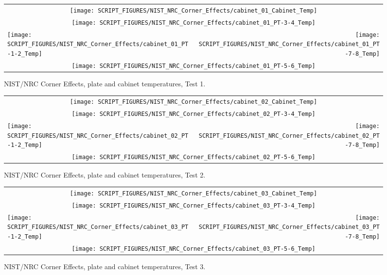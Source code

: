 \newpage

\begin{figure}[p]
\begin{tabular*}{\textwidth}{l@{\extracolsep{\fill}}r}
\multicolumn{2}{c}{\texttt{[image: SCRIPT\_FIGURES/NIST\_NRC\_Corner\_Effects/cabinet\_01\_Cabinet\_Temp]}} \\
\multicolumn{2}{c}{\texttt{[image: SCRIPT\_FIGURES/NIST\_NRC\_Corner\_Effects/cabinet\_01\_PT-3-4\_Temp]}} \\
\texttt{[image: SCRIPT\_FIGURES/NIST\_NRC\_Corner\_Effects/cabinet\_01\_PT-1-2\_Temp]} &
\texttt{[image: SCRIPT\_FIGURES/NIST\_NRC\_Corner\_Effects/cabinet\_01\_PT-7-8\_Temp]} \\
\multicolumn{2}{c}{\texttt{[image: SCRIPT\_FIGURES/NIST\_NRC\_Corner\_Effects/cabinet\_01\_PT-5-6\_Temp]}}
\end{tabular*}
\caption{NIST/NRC Corner Effects, plate and cabinet temperatures, Test 1.}
\label{NIST_NRC_Cabinet_PT_Test_1}
\end{figure}

\begin{figure}[p]
\begin{tabular*}{\textwidth}{l@{\extracolsep{\fill}}r}
\multicolumn{2}{c}{\texttt{[image: SCRIPT\_FIGURES/NIST\_NRC\_Corner\_Effects/cabinet\_02\_Cabinet\_Temp]}} \\
\multicolumn{2}{c}{\texttt{[image: SCRIPT\_FIGURES/NIST\_NRC\_Corner\_Effects/cabinet\_02\_PT-3-4\_Temp]}} \\
\texttt{[image: SCRIPT\_FIGURES/NIST\_NRC\_Corner\_Effects/cabinet\_02\_PT-1-2\_Temp]} &
\texttt{[image: SCRIPT\_FIGURES/NIST\_NRC\_Corner\_Effects/cabinet\_02\_PT-7-8\_Temp]} \\
\multicolumn{2}{c}{\texttt{[image: SCRIPT\_FIGURES/NIST\_NRC\_Corner\_Effects/cabinet\_02\_PT-5-6\_Temp]}}
\end{tabular*}
\caption{NIST/NRC Corner Effects, plate and cabinet temperatures, Test 2.}
\label{NIST_NRC_Cabinet_PT_Test_2}
\end{figure}

\begin{figure}[p]
\begin{tabular*}{\textwidth}{l@{\extracolsep{\fill}}r}
\multicolumn{2}{c}{\texttt{[image: SCRIPT\_FIGURES/NIST\_NRC\_Corner\_Effects/cabinet\_03\_Cabinet\_Temp]}} \\
\multicolumn{2}{c}{\texttt{[image: SCRIPT\_FIGURES/NIST\_NRC\_Corner\_Effects/cabinet\_03\_PT-3-4\_Temp]}} \\
\texttt{[image: SCRIPT\_FIGURES/NIST\_NRC\_Corner\_Effects/cabinet\_03\_PT-1-2\_Temp]} &
\texttt{[image: SCRIPT\_FIGURES/NIST\_NRC\_Corner\_Effects/cabinet\_03\_PT-7-8\_Temp]} \\
\multicolumn{2}{c}{\texttt{[image: SCRIPT\_FIGURES/NIST\_NRC\_Corner\_Effects/cabinet\_03\_PT-5-6\_Temp]}}
\end{tabular*}
\caption{NIST/NRC Corner Effects, plate and cabinet temperatures, Test 3.}
\label{NIST_NRC_Cabinet_PT_Test_3}
\end{figure}

